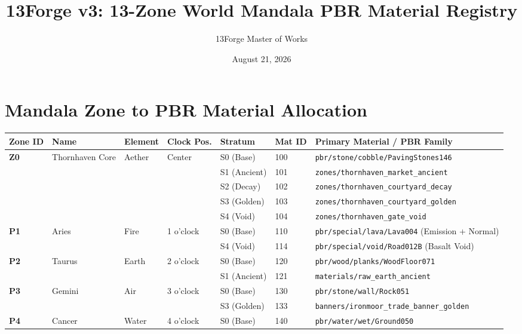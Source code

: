 \documentclass{article}
\title{\textbf{13Forge v3: 13-Zone World Mandala PBR Material Registry}}
\author{13Forge Master of Works}
\date{August 21, 2026}
\begin{document}
\maketitle

\section*{Mandala Zone to PBR Material Allocation}

\begin{table}[htbp]
\centering
\small
\begin{tabular}{@{}lllllll@{}}
\toprule
\textbf{Zone ID} & \textbf{Name} & \textbf{Element} & \textbf{Clock Pos.} & \textbf{Stratum} & \textbf{Mat ID} & \textbf{Primary Material / PBR Family} \\
\midrule
\textbf{Z0} & Thornhaven Core & Aether & Center & S0 (Base) & 100 & \texttt{pbr/stone/cobble/PavingStones146} \\
            &                 &        &        & S1 (Ancient) & 101 & \texttt{zones/thornhaven\_market\_ancient} \\
            &                 &        &        & S2 (Decay)   & 102 & \texttt{zones/thornhaven\_courtyard\_decay} \\
            &                 &        &        & S3 (Golden)  & 103 & \texttt{zones/thornhaven\_courtyard\_golden} \\
            &                 &        &        & S4 (Void)    & 104 & \texttt{zones/thornhaven\_gate\_void} \\
\midrule
\textbf{P1} & Aries           & Fire   & 1 o'clock & S0 (Base) & 110 & \texttt{pbr/special/lava/Lava004} (Emission + Normal) \\
            &                 &        &           & S4 (Void) & 114 & \texttt{pbr/special/void/Road012B} (Basalt Void) \\
\midrule
\textbf{P2} & Taurus          & Earth  & 2 o'clock & S0 (Base) & 120 & \texttt{pbr/wood/planks/WoodFloor071} \\
            &                 &        &           & S1 (Ancient) & 121 & \texttt{materials/raw\_earth\_ancient} \\
\midrule
\textbf{P3} & Gemini          & Air    & 3 o'clock & S0 (Base) & 130 & \texttt{pbr/stone/wall/Rock051} \\
            &                 &        &           & S3 (Golden)  & 133 & \texttt{banners/ironmoor\_trade\_banner\_golden} \\
\midrule
\textbf{P4} & Cancer          & Water  & 4 o'clock & S0 (Base) & 140 & \texttt{pbr/water/wet/Ground050} \\

\end{tabular}
\end{table}
\end{document}
